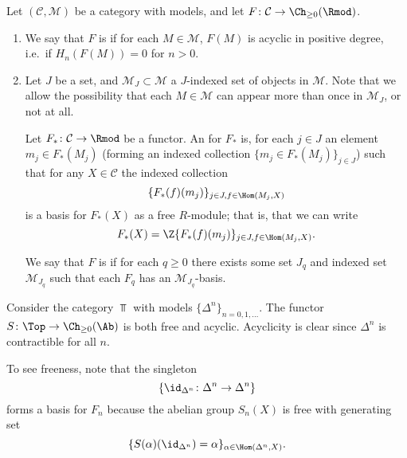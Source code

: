 \documentclass[main.tex]{subfiles}
\begin{document}
\begin{definition}
  \label{def:free_acyclic_functor}
  Let $(\mathcal{C}, \mathcal{M})$ be a category with models, and let $F\colon \mathcal{C} \to \Ch_{\geq 0}(\Rmod)$.

  \begin{enumerate}
    \item We say that $F$ is  if for each $M \in \mathcal{M}$, $F(M)$ is acyclic in positive degree, i.e.\ if $H_{n}(F(M)) = 0$ for $n > 0$.

    \item Let $J$ be a set, and $\mathcal{M}_{J} \subset \mathcal{M}$ a $J$-indexed set of objects in $\mathcal{M}$. Note that we allow the possibility that each $M \in \mathcal{M}$ can appear more than once in \(\mathcal{M}_{J}\), or not at all.

      Let $F_{*}\colon \mathcal{C} \to \Rmod$ be a functor. An  for $F_{*}$ is, for each $j \in J$ an element $m_{j} \in F_{*}(M_{j})$ (forming an indexed collection $\{m_{j} \in F_{*}(M_{j})\}_{j \in J}$) such that for any $X \in \mathcal{C}$ the indexed collection
      \begin{equation*}
        \{F_{*}(f)(m_{j})\}_{j \in J, f \in \Hom(M_{j}, X)}
      \end{equation*}
      is a basis for $F_{*}(X)$ as a free $R$-module; that is, that we can write
      \begin{equation*}
        F_{*}(X) = \Z\{F_{*}(f)(m_{j})\}_{j \in J, f \in \Hom(M_{j}, X)}.
      \end{equation*}

      We say that $F$ is  if for each $q \geq 0$ there exists some set $J_{q}$ and indexed set $\mathcal{M}_{J_{q}}$ such that each $F_{q}$ has an $\mathcal{M}_{J_{q}}$-basis.
  \end{enumerate}
\end{definition}

\begin{example}
  Consider the category $\Top$ with models $\{\Delta^{n}\}_{n = 0, 1, \ldots}$. The functor $S\colon \Top \to \Ch_{\geq 0}(\Ab)$ is both free and acyclic. Acyclicity is clear since $\Delta^{n}$ is contractible for all $n$.

  To see freeness, note that the singleton
  \begin{equation*}
    \{\id_{\Delta^{n}}\colon \Delta^{n} \to \Delta^{n}\}
  \end{equation*}
  forms a basis for $F_{n}$ because the abelian group $S_{n}(X)$ is free with generating set
  \begin{equation*}
    \{S(\alpha)(\id_{\Delta^{n}}) = \alpha\}_{\alpha \in \Hom(\Delta^{n}, X)}.
  \end{equation*}
\end{example}
\end{document}
